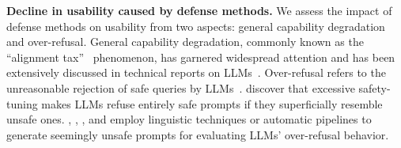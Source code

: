 \textbf{Decline in usability caused by defense methods.} %
We assess the impact of defense methods on usability from two aspects: general capability degradation and over-refusal.
%
General capability degradation, commonly known as the ``alignment tax''~\cite{alignment_tax} phenomenon, has garnered widespread attention and has been extensively discussed in technical reports on LLMs~\cite{dubey2024llama,inan2023llama,actor_attack,li2024wmdp,vlsbench}.
%
Over-refusal refers to the unreasonable rejection of safe queries by LLMs~\cite{varshney2023art,zhao2024towards,zou2023representation,arditi2024refusal,cao2024nothing}.
\citet{bianchi2023safety} discover that excessive safety-tuning makes LLMs refuse entirely safe prompts if they superficially resemble unsafe ones.
%
\citet{xstest}, \citet{oktest}, \citet{orbench}, and \citet{phtest} employ linguistic techniques or automatic pipelines to generate seemingly unsafe prompts for evaluating LLMs’ over-refusal behavior.
%
% 
